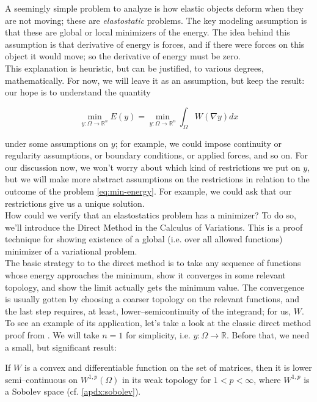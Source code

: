 \documentclass[../main.tex]{subfiles}
\begin{document}
A seemingly simple problem to analyze is how elastic objects deform when they are not moving; these are \emph{elastostatic} problems.
The key modeling assumption is that these are global or local minimizers of the energy.
The idea behind this assumption is that derivative of energy is forces, and if there were forces on this object it would move; so the derivative of energy must be zero. \\

This explanation is heuristic, but can be justified, to various degrees, mathematically.
For now, we will leave it as an assumption, but keep the result: our hope is to understand the quantity

\begin{equation}
  \label{eq:min-energy}
  \min_{y: \Omega \to \mathbb{R}^n} E(y) = \min_{y: \Omega \to \mathbb{R}^n} \int_{\Omega}W( \nabla y) dx
\end{equation}

under some assumptions on $y$; for example, we could impose continuity or regularity assumptions, or boundary conditions, or applied forces, and so on.
For our discussion now, we won't worry about which kind of restrictions we put on $y$, but we will make more abstract assumptions on the restrictions in relation to the outcome of the problem \eqref{eq:min-energy}.
For example, we could ask that our restrictions give us a unique solution. \\

How could we verify that an elastostatics problem has a minimizer? To do so, we'll introduce the Direct Method in the Calculus of Variations.
This is a proof technique for showing existence of a global (i.e. over all allowed functions) minimizer  of a variational problem. \\

The basic strategy to to the direct method is to take any sequence of functions whose energy approaches the minimum, show it converges in some relevant topology, and show the limit actually gets the minimum value.
The convergence is usually gotten by choosing a coarser topology on the relevant functions, and the last step requires, at least, lower--semicontinuity of the integrand; for us, $W$.
To see an example of its application, let's take a look at the classic direct method proof from \cite{evans_partial_2010}.
We will take $n=1$ for simplicity, i.e. $y: \Omega \to \mathbb{R}$.
Before that, we need a small, but significant result:

\begin{lem}
  If $W$ is a convex and differentiable function on the set of matrices, then it is lower semi--continuous on $W^{1,p}(\Omega)$ in its weak topology for $1 < p < \infty$, where $W^{1,p}$ is a Sobolev space (cf. \ref{apdx:sobolev}).
\end{lem}
\end{document}
